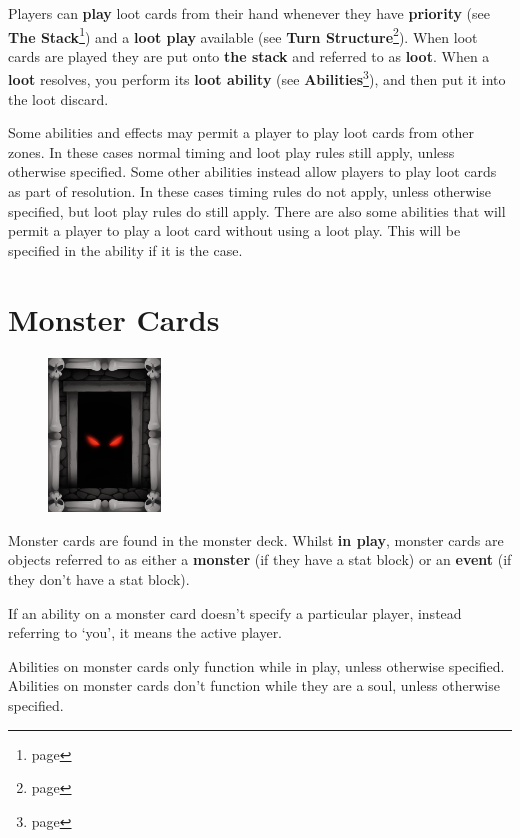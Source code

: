 \documentclass[a4paper, twoside]{report} %
\begin{document}
    Players can \textbf{play} loot cards from their hand whenever they have \textbf{priority} (see \textbf{The Stack}\footnote{page \pageref{stack}}) and a \textbf{loot play} available (see \textbf{Turn Structure}\footnote{page \pageref{turn}}). When loot cards are played they are put onto \textbf{the stack} and referred to as \textbf{loot}. When a \textbf{loot} resolves, you perform its \textbf{loot ability} (see \textbf{Abilities}\footnote{page \pageref{abilities}}), and then put it into the loot discard.

    Some abilities and effects may permit a player to play loot cards from other zones. In these cases normal timing and loot play rules still apply, unless otherwise specified. Some other abilities instead allow players to play loot cards as part of resolution. In these cases timing rules do not apply, unless otherwise specified, but loot play rules do still apply. There are also some abilities that will permit a player to play a loot card without using a loot play. This will be specified in the ability if it is the case.

    \section{Monster Cards}
    \begin{figure}
        \centering
        \includegraphics[width=30mm]{assets/monster.png}
    \end{figure}
    Monster cards are found in the monster deck. Whilst \textbf{in play}, monster cards are objects referred to as either a \textbf{monster} (if they have a stat block) or an \textbf{event} (if they don’t have a stat block).

    If an ability on a monster card doesn’t specify a particular player, instead referring to ‘you’, it means the active player.

    Abilities on monster cards only function while in play, unless otherwise specified. Abilities on monster cards don’t function while they are a soul, unless otherwise specified.
\end{document}
